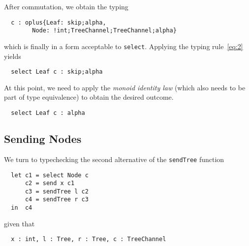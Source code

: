 After commutation, we obtain the typing
\begin{lstlisting}
  c : oplus{Leaf: skip;alpha,
        Node: !int;TreeChannel;TreeChannel;alpha}
\end{lstlisting}
which is finally in a form acceptable to \lstinline|select|. Applying
the typing rule~\eqref{eq:2} yields
\begin{lstlisting}
  select Leaf c : skip;alpha
\end{lstlisting}
At this point, we need to apply the \emph{monoid identity law} (which
also needs to be part of type equivalence) to obtain the desired
outcome.
\begin{lstlisting}
  select Leaf c : alpha
\end{lstlisting}


\subsection{Sending Nodes}
\label{sec:sending-nodes}

We turn to typechecking the second alternative of the
\lstinline|sendTree| function
\begin{lstlisting}
  let c1 = select Node c
      c2 = send x c1
      c3 = sendTree l c2
      c4 = sendTree r c3
  in  c4
\end{lstlisting}
given that 
\begin{lstlisting}
  x : int, l : Tree, r : Tree, c : TreeChannel
\end{lstlisting}

